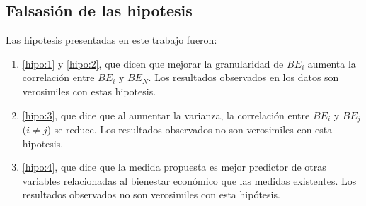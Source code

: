 \subsection{Falsasión de las hipotesis}

Las hipotesis presentadas en este trabajo fueron:

\begin{enumerate}
    \item \ref{hipo:1} y \ref{hipo:2}, que dicen que mejorar la granularidad de $BE_i$ aumenta la correlación entre $BE_i$ y $BE_N$. Los resultados observados en los datos son verosimiles con estas hipotesis.
    \item \ref{hipo:3}, que dice que al aumentar la varianza, la correlación entre $BE_i$ y $BE_j$ ($i \neq j$) se reduce. Los resultados observados no son verosimiles con esta hipotesis.
    \item \ref{hipo:4}, que dice que la medida propuesta es mejor predictor de otras variables relacionadas al bienestar económico que las medidas existentes. Los resultados observados no son verosimiles con esta hipótesis.
\end{enumerate}

